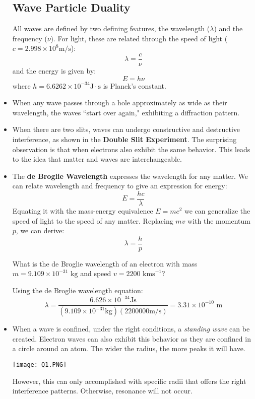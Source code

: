 \documentclass{article}
\begin{document}
\begin{itemize}
    \subsection{Wave Particle Duality}
    \begin{review}
        All waves are defined by two defining features, the wavelength ($\lambda$) and the frequency ($\nu$). For light, these are related through the speed of light ($c=2.998 \times 10^8 \text{m/s}$):
        \begin{equation}
            \lambda = \frac{c}{\nu}
        \end{equation}
        and the energy is given by:
        \begin{equation}
            E = h\nu
        \end{equation}
        where $h = 6.6262 \times 10^{-34} \text{J}\cdot\text{s}$ is Planck's constant.
    \end{review}
    \item When any wave passes through a hole approximately as wide as their wavelength, the waves ``start over again," exhibiting a diffraction pattern.
    \item When there are two slits, waves can undergo constructive and destructive interference, as shown in the \textbf{Double Slit Experiment}. The surprising observation is that when electrons also exhibit the same behavior. This leads to the idea that matter and waves are interchangeable.
    \item The \textbf{de Broglie Wavelength} expresses the wavelength for any matter. We can relate wavelength and frequency to give an expression for energy:
    $$E = \frac{hc}{\lambda}$$
    Equating it with the mass-energy equivalence $E=mc^2$ we can generalize the speed of light to the speed of any matter. Replacing $mv$ with the momentum $p$, we can derive:
    \begin{equation}
        \lambda = \frac{h}{p}
    \end{equation}
    \begin{exampleQ}
        What is the de Broglie wavelength of an electron with mass $m=9.109 \times 10^{-31} \text{ kg}$ and speed $v = 2200 \text{ kms}^{-1}$?
    \end{exampleQ}
    \begin{exampleS}
        Using the de Broglie wavelength equation:
        $$\lambda = \frac{6.626 \times 10^{-34} \text{Js}}{(9.109 \times 10^{-31}\text{kg})(2200000 \text{m/s})} =  3.31 \times 10^{-10} \text{ m}$$
    \end{exampleS}
    \item When a wave is confined, under the right conditions, a \textit{standing wave} can be created. Electron waves can also exhibit this behavior as they are confined in a circle around an atom. The wider the radius, the more peaks it will have.
    \begin{center}\texttt{[image: Q1.PNG]}\end{center}
    However, this can only accomplished with specific radii that offers the right interference patterns. Otherwise, resonance will not occur.

\end{itemize}
\end{document}
